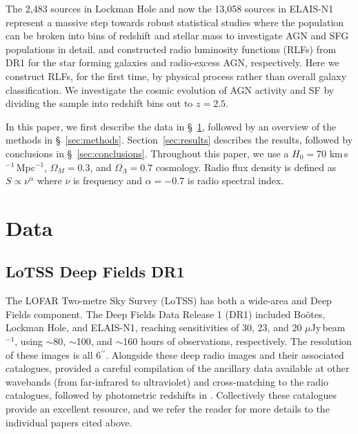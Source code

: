 \documentclass[usenatbib,fleqn,letters]{mnras}
\newcommand{\sarc}{$^{\prime\prime}\!\!$}
\newcommand{\muJybm}{$\mu$Jy$\,$beam$^{-1}$}
\begin{document}
The 2,483 sources in Lockman Hole \citep{sweijen_deep_2022} and now the 13,058 sources in ELAIS-N1 \citep{de_jong_into_2024} represent a massive step towards robust statistical studies where the population can be broken into bins of redshift and stellar mass to investigate AGN and SFG populations in detail. \cite{cochrane_lofar_2023} and \cite{kondapally_cosmic_2022} constructed radio luminosity functions (RLFs) from DR1 for the star forming galaxies and radio-excess AGN, respectively. Here we construct RLFs, for the first time, by physical process rather than overall galaxy classification. 
We investigate the cosmic evolution of AGN activity and SF by dividing the sample into redshift bins out to $z = 2.5$. 

In this paper, we first describe the data in \S~\ref{sec:data}, followed by an overview of the methods in \S~\ref{sec:methods}. Section~\ref{sec:results} describes the results, followed by conclusions in \S~\ref{sec:conclusions}. Throughout this paper, we use a $H_0 = 70$ km$\,$s$^{-1}\,$Mpc$^{-1}$, $\Omega_M = 0.3$, and $\Omega_{\Lambda}= 0.7$ cosmology. Radio flux density is defined as $S\propto \nu^{\alpha}$ where $\nu$ is frequency and $\alpha = -0.7$ is radio spectral index. 


\section{Data}
\label{sec:data}

\subsection{LoTSS Deep Fields DR1}
\label{subsec:dr1}
The LOFAR Two-metre Sky Survey (LoTSS) has both a wide-area \citep{shimwell_lofar_2017,shimwell_lofar_2019,shimwell_lofar_2022} and Deep Fields \citep{tasse_lofar_2021,sabater_lofar_2021} component. The Deep Fields Data Release 1 (DR1) included Boötes, Lockman Hole, and ELAIS-N1, reaching sensitivities of 30, 23, and 20 \muJybm , using $\sim$80, $\sim$100, and $\sim$160 hours of observations, respectively. The resolution of these images is all 6\sarc . Alongside these deep radio images and their associated catalogues, \cite{kondapally_lofar_2021} provided a careful compilation of the ancillary data available at other wavebands (from far-infrared to ultraviolet) and cross-matching to the radio catalogues, followed by photometric redshifts in \cite{duncan_lofar_2021}. Collectively these catalogues provide an excellent resource, and we refer the reader for more details to the individual papers cited above.
\end{document}
